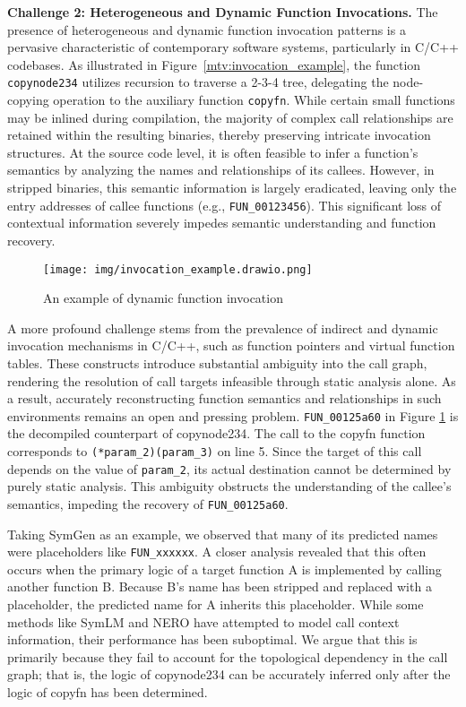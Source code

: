 \documentclass[acmsmall,screen,review,anonymous]{acmart} %
\begin{document}
\textbf{Challenge 2: Heterogeneous and Dynamic Function Invocations.}
The presence of heterogeneous and dynamic function invocation patterns is a pervasive characteristic of contemporary software systems, particularly in C/C++ codebases. As illustrated in Figure~\ref{mtv:invocation_example}, the function \lstinline{copynode234} utilizes recursion to traverse a 2-3-4 tree, delegating the node-copying operation to the auxiliary function \lstinline{copyfn}. While certain small functions may be inlined during compilation, the majority of complex call relationships are retained within the resulting binaries, thereby preserving intricate invocation structures. At the source code level, it is often feasible to infer a function’s semantics by analyzing the names and relationships of its callees. However, in stripped binaries, this semantic information is largely eradicated, leaving only the entry addresses of callee functions (e.g., \lstinline{FUN_00123456}). This significant loss of contextual information severely impedes semantic understanding and function recovery.


\begin{figure}[h] %
    \centering
    \texttt{[image: img/invocation\_example.drawio.png]} %
    \caption{An example of dynamic function invocation} %
    \label{fig:invocation_example} %
\end{figure}

A more profound challenge stems from the prevalence of indirect and dynamic invocation mechanisms in C/C++, such as function pointers and virtual function tables. These constructs introduce substantial ambiguity into the call graph, rendering the resolution of call targets infeasible through static analysis alone. As a result, accurately reconstructing function semantics and relationships in such environments remains an open and pressing problem. \lstinline{FUN_00125a60} in Figure \ref{fig:invocation_example} is the decompiled counterpart of copynode234. The call to the copyfn function corresponds to \lstinline{(*param_2)(param_3)} on line 5. Since the target of this call depends on the value of \lstinline{param_2}, its actual destination cannot be determined by purely static analysis. This ambiguity obstructs the understanding of the callee's semantics, impeding the recovery of \lstinline{FUN_00125a60}.

Taking SymGen\cite{SymGen} as an example, we observed that many of its predicted names were placeholders like \lstinline{FUN_xxxxxx}. A closer analysis revealed that this often occurs when the primary logic of a target function A is implemented by calling another function B. Because B's name has been stripped and replaced with a placeholder, the predicted name for A inherits this placeholder. While some methods like SymLM\cite{SymLM} and NERO\cite{NERO} have attempted to model call context information, their performance has been suboptimal. We argue that this is primarily because they fail to account for the topological dependency in the call graph; that is, the logic of copynode234 can be accurately inferred only after the logic of copyfn has been determined.
\end{document}
